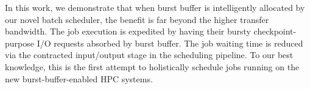 In this work, we demonstrate that when burst buffer is intelligently allocated 
by our novel batch scheduler, the benefit is far beyond the higher transfer bandwidth.
The job execution is expedited by having their bursty checkpoint-purpose I/O requests
absorbed by burst buffer. The job waiting time is reduced via the contracted input/output stage in the scheduling pipeline.
To our best knowledge, this is the first attempt to holistically schedule jobs running on the new burst-buffer-enabled HPC systems.



